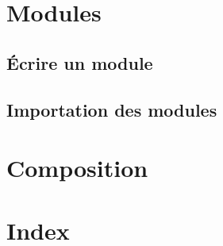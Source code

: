 \documentclass[a5paper,french]{article}
\begin{document}
\section{ Modules}
\subsection{ Écrire un module}
\subsection{ Importation des modules}
\section{ Composition}

\appendix

\section{Index}

\printindex
\end{document}
